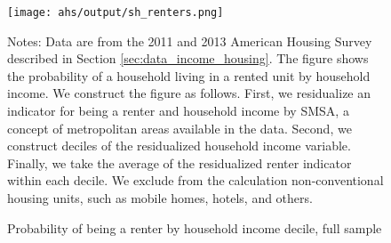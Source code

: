 \begin{figure}[h!]
    \centering
    \caption{Probability of being a renter by household income decile,
             full sample}
    \label{fig:ahs_pr_renters}

    \texttt{[image: ahs/output/sh\_renters.png]}

    \begin{minipage}{.95\textwidth} \footnotesize
        \vspace{3mm}
        Notes: Data are from the 2011 and 2013 American Housing
        Survey \parencite{ahs2020} described in Section \ref{sec:data_income_housing}.
        The figure shows the probability of a household living in a
        rented unit by household income. 
        We construct the figure as follows.
        First, we residualize an indicator for being a renter and 
        household income by SMSA, a concept of metropolitan areas 
        available in the data.
        Second, we construct deciles of the residualized household
        income variable.
        Finally, we take the average of the residualized renter 
        indicator within each decile.
        We exclude from the calculation non-conventional housing units, 
        such as mobile homes, hotels, and others.
    \end{minipage}
\end{figure}
